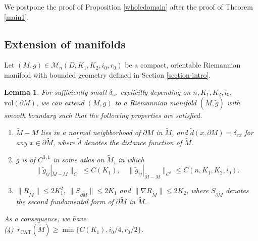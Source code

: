 \documentclass[11pt,letterpaper]{amsart}
\numberwithin{equation}{section}
\theoremstyle{definition}
\theoremstyle{plain}
\theoremstyle{definition}
\theoremstyle{plain}
\newtheorem{extensionmetric}[main1]{Lemma}
\theoremstyle{definition}
\theoremstyle{plain}
\newcommand{\vol}{\textrm{vol}}
\begin{document}
We postpone the proof of Proposition \ref{wholedomain}
after the proof of Theorem \ref{main1}.


\subsection{Extension of manifolds} \label{subsection-extension} \hfill

\smallskip
Let $(M,g)\in \mathcal{M}_n(D,K_1,K_2,i_0,r_0)$ be a compact, orientable Riemannian manifold with bounded geometry defined in Section \ref{section-intro}.

\begin{extensionmetric}\label{extensionmetric}
For sufficiently small $\delta_{ex}$ explicitly depending on $n,K_1,K_2,i_0,$ $\vol(\partial M)$, we can extend $(M,g)$ to a Riemannian manifold $(\widetilde{M},\widetilde{g})$ with smooth boundary such that the following properties are satisfied.
\begin{enumerate}[(1)]
\item $\widetilde{M}-M$ lies in a normal neighborhood of $\partial M$ in $\widetilde{M}$, and $\widetilde{d}(x,\partial M)=\delta_{ex}$ for any $x\in \partial \widetilde{M}$, where $\widetilde{d}$ denotes the distance function of $\widetilde{M}$.
\item $\widetilde{g}$ is of $C^{3,1}$ in some atlas on $\widetilde{M}$, in which 
$$\|\widetilde{g}_{ij}|_{\widetilde{M}-M}\|_{C^1}\leqslant C(K_1),\quad \|\widetilde{g}_{ij}|_{\widetilde{M}-M}\|_{C^4}\leqslant C(n,K_1,K_2,i_0).$$
\item $\|R_{\widetilde{M}}\|\leqslant 2K_1^2$, $\|S_{\partial \widetilde{M}}\|\leqslant 2K_1$ and $\|\nabla R_{\widetilde{M}}\|\leqslant 2K_2$, where $S_{\partial \widetilde{M}}$ denotes the second fundamental form of $\partial \widetilde{M}$ in $\widetilde{M}$.
\end{enumerate}

As a consequence, we have\\
(4) \,$r_{\textrm{CAT}}(\widetilde{M})\geqslant \min \big\{C(K_1),i_0/4,r_0/2 \big\}$.
\end{extensionmetric}
\end{document}
